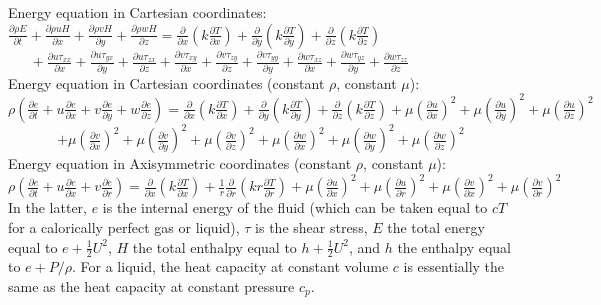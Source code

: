 \documentclass[oneside,onecolumn,a4paper,10pt,notitlepage]{tables}
\newcommand{\mfd}{\displaystyle}
\begin{document}
\vfill
Energy equation in Cartesian coordinates:\\[0.5em]
$
\mfd \frac{\partial \rho E}{\partial t} + \frac{\partial \rho u H}{\partial x} + \frac{\partial \rho v H}{\partial y} + \frac{\partial \rho w H}{\partial z} 
=
 \frac{\partial}{\partial x}\left( k \frac{\partial T}{\partial x} \right) 
+\frac{\partial}{\partial y}\left( k \frac{\partial T}{\partial y} \right) 
+\frac{\partial}{\partial z}\left(k \frac{\partial T}{\partial z} \right) 
$
\\[0.3em]
$
~~~~~~~
\mfd 
+\frac{\partial u \tau_{xx}}{\partial x}
+\frac{\partial u \tau_{yx}}{\partial y}
+\frac{\partial u \tau_{zx}}{\partial z}
+\frac{\partial v \tau_{xy}}{\partial x}
+\frac{\partial v \tau_{zy}}{\partial z}
+\frac{\partial v \tau_{yy}}{\partial y}
+\frac{\partial w \tau_{xz}}{\partial x}
+\frac{\partial w \tau_{yz}}{\partial y}
+\frac{\partial w \tau_{zz}}{\partial z}
$\\[0.8em]
\vfill
Energy equation in Cartesian coordinates (constant $\rho$, constant $\mu$):\\[0.3em]
$
\mfd \rho \left(\frac{\partial e}{\partial t} + u \frac{\partial e}{\partial x} + v \frac{\partial e}{\partial y} + w \frac{\partial e}{\partial z} \right)
=
 \frac{\partial}{\partial x}\left(k \frac{\partial T}{\partial x} \right) + \frac{\partial}{\partial y}\left(k \frac{\partial T}{\partial y} \right) +\frac{\partial}{\partial z}\left(k \frac{\partial T}{\partial z} \right)
+       \mu \left(\frac{\partial u}{\partial x} \right)^2 
	+ \mu \left(\frac{\partial u}{\partial y} \right)^2
	+ \mu \left(\frac{\partial u}{\partial z} \right)^2
$ \\[0.9em]
~~~~~~~$\mfd
	+ \mu \left(\frac{\partial v}{\partial x} \right)^2 
	+ \mu \left(\frac{\partial v}{\partial y} \right)^2
	+ \mu \left(\frac{\partial v}{\partial z} \right)^2
	+ \mu \left(\frac{\partial w}{\partial x} \right)^2 
	+ \mu \left(\frac{\partial w}{\partial y} \right)^2
	+ \mu \left(\frac{\partial w}{\partial z} \right)^2
$\\[0.8em]
\vfill
Energy equation in Axisymmetric coordinates (constant $\rho$, constant $\mu$):\\[0.3em]
$
\mfd \rho \left(\frac{\partial e}{\partial t} + u \frac{\partial e}{\partial x} + v \frac{\partial e}{\partial r}  \right)
=
  \frac{\partial }{\partial x}\left(k\frac{\partial T}{\partial x} \right) + \frac{1}{r} \frac{\partial }{\partial r} \left(kr \frac{\partial T}{\partial r} \right) 
+       \mu \left(\frac{\partial u}{\partial x} \right)^2 
	+ \mu \left(\frac{\partial u}{\partial r} \right)^2
	+ \mu \left(\frac{\partial v}{\partial x} \right)^2 
	+ \mu \left(\frac{\partial v}{\partial r} \right)^2
$\\[0.8em]
In the latter, $e$ is the internal energy of the fluid (which can be taken equal to $c T$ for a calorically perfect gas or liquid), $\tau$ is the shear stress, $E$ the total energy equal to $e+\frac{1}{2} U^2$, $H$ the total enthalpy equal to $h+\frac{1}{2} U^2$, and $h$ the enthalpy equal to $e+P/\rho$. For a liquid, the heat capacity at constant volume $c$ is essentially the same as the heat capacity at constant pressure $c_p$.\\[1.0em]
\vfill
\end{document}
